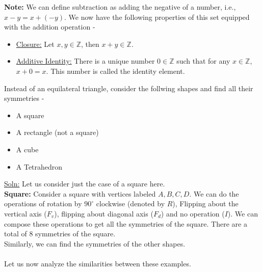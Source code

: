 \documentclass[openany]{book}
\begin{document}
\begin{enumerate}
\textbf{Note: } We can define subtraction as adding the negative of a number, i.e., $x - y = x + (-y)$. We now have the following properties of this set equipped with the addition operation -
\begin{itemize}
    \item \underline{Closure:} Let $x, y \in \mathbb{Z}$, then $x + y \in \mathbb{Z}$.
    \item \underline{Additive Identity:} There is a unique number \( 0 \in \mathbb{Z} \) such that for any \( x \in \mathbb{Z} \), \( x + 0 = x \). This number is called the identity element.
\end{itemize}
\end{enumerate}
\begin{exercise}
    Instead of an equilateral triangle, consider the follwing shapes and find all their symmetries - 
    \begin{itemize}
        \item A square
        \item A rectangle (not a square)
        \item A cube
        \item A Tetrahedron
    \end{itemize}
\end{exercise}
\underline{Soln:} Let us consider just the case of a square here. \\ 
\textbf{Square:} Consider a square with vertices labeled \( A, B, C, D \). We can do the operations of rotation by \( 90^\circ \) clockwise (denoted by $R$), Flipping about the vertical axis ($F_v$), flipping about diagonal axis ($F_d$) and no operation ($I$). We can compose these operations to get all the symmetries of the square. There are a total of 8 symmetries of the square. \\
Similarly, we can find the symmetries of the other shapes. \\\\
Let us now analyze the similarities between these examples. 
\end{document}
